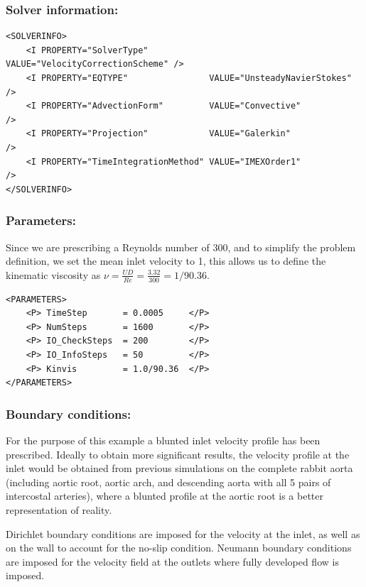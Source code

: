 \subsubsection{Solver information:~}
\begin{lstlisting}[style=XMLStyle]
<SOLVERINFO>
    <I PROPERTY="SolverType"            VALUE="VelocityCorrectionScheme" />
    <I PROPERTY="EQTYPE"                VALUE="UnsteadyNavierStokes"     />
    <I PROPERTY="AdvectionForm"         VALUE="Convective"               />
    <I PROPERTY="Projection"            VALUE="Galerkin"                 />
    <I PROPERTY="TimeIntegrationMethod" VALUE="IMEXOrder1"               />
</SOLVERINFO>
\end{lstlisting}

\subsubsection{Parameters:~} Since we are prescribing a Reynolds number of 300, and to simplify the problem definition, we set the mean inlet velocity to 1, this allows us to define the kinematic viscosity as $\nu = \frac{UD}{Re}=\frac{3.32}{300} = 1/90.36$.

\begin{lstlisting}[style=XMLStyle]
<PARAMETERS>
    <P> TimeStep       = 0.0005     </P>
    <P> NumSteps       = 1600       </P>
    <P> IO_CheckSteps  = 200        </P>
    <P> IO_InfoSteps   = 50         </P>
    <P> Kinvis         = 1.0/90.36  </P>
</PARAMETERS>
\end{lstlisting}

\subsubsection{Boundary conditions:~} For the purpose of this example a blunted inlet velocity profile has been prescribed. Ideally to obtain more significant results, the velocity profile at the inlet would be obtained from previous simulations on the complete rabbit aorta (including aortic root, aortic arch, and descending aorta with all 5 pairs of intercostal arteries), where a blunted profile at the aortic root is a better representation of reality.

Dirichlet boundary conditions are imposed for the velocity at the inlet, as well as on the wall to account for the no-slip condition. Neumann boundary conditions are imposed for the velocity field at the outlets where fully developed flow is imposed.

